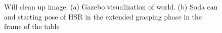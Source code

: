 \documentclass[12pt]{article}
\begin{document}
                \begin{figure}[ht]
                    \centering
                    \quad
                    \caption{Will clean up image. (a) Gazebo visualization of world. (b) Soda can and starting pose of HSR in the extended grasping phase in the frame of the table}
                    \label{fig:figure}
                \end{figure}
        \newpage           
\end{document}
